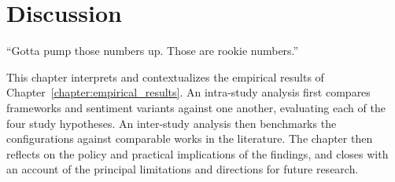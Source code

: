\chapter{Discussion}
\label{chapter:discussion}


\begin{introduction}
\begin{flushright}
``Gotta pump those numbers up. Those are rookie numbers.''
\end{flushright}

\vspace{0.5em}

This chapter interprets and contextualizes the empirical results of Chapter~\ref{chapter:empirical_results}. An intra-study analysis first compares frameworks and sentiment variants against one another, evaluating each of the four study hypotheses. An inter-study analysis then benchmarks the configurations against comparable works in the literature. The chapter then reflects on the policy and practical implications of the findings, and closes with an account of the principal limitations and directions for future research.
\end{introduction}


